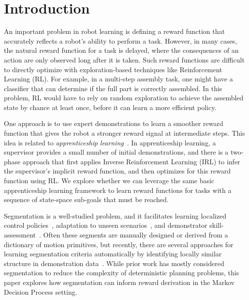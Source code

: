 \section{Introduction}
An important problem in robot learning is defining a reward function that accurately reflects a robot's ability to perform a task.
However, in many cases, the natural reward function for a task is delayed, where the consequences of an action are only observed long after it is taken.
Such reward functions are difficult to directly optimize with exploration-based techniques like Reinforcement Learning (RL).
For example, in a multi-step assembly task, one might have a classifier that can determine if the full part is correctly assembled.
In this problem, RL would have to rely on random exploration to achieve the assembled state by chance at least once, before it can learn a more efficient policy.

One approach is to use expert demonstrations to learn a smoother reward function that gives the robot a stronger reward signal at intermediate steps.
This idea is related to \emph{apprenticeship learning}~\citep{DBLP:conf/nips/KolterAN07, coates2008learning, abbeel2004apprenticeship}.
In apprenticeship learning, a supervisor provides a small number of initial demonstrations, and there is a two-phase approach that first applies Inverse Reinforcement Learning (IRL) to infer the supervisor's implicit reward function, and then optimizes for this reward function using RL.
We explore whether we can leverage the same basic apprenticeship learning framework to learn reward functions for tasks with a sequence of state-space sub-goals that must be reached.

Segmentation is a well-studied problem, and it facilitates learning localized control policies~\citep{murali2015learning, niekum2012learning, konidaris2011robot}, adaptation to unseen scenarios~\citep{ijspreet2002learning, ude2010task}, and demonstrator skill-assessment~\citep{reiley2010motion, gao2014jigsaws}.
Often these segments are manually designed or derived from a dictionary of motion primitives, but recently, there are several approaches for learning segmentation criteria automatically by identifying locally similar structure in demonstration data~\citep{barbivc2004segmenting, chiappa2010movement,  alvarez2010switched,calinon2010learning, kruger2012imitation, niekum2012learning, wachter2015hierarchical, lee2015autonomous}.
While prior work has mostly considered segmentation to reduce the complexity of deterministic planning problems, this paper explores how segmentation can inform reward derivation in the Markov Decision Process setting.

